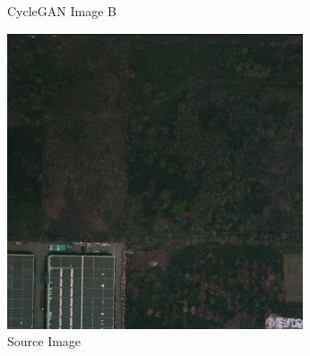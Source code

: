 \documentclass[10pt,twocolumn,letterpaper]{article}
\begin{document}
{\begin{figure}[t]
\begin{minipage}{0.48\textwidth}
\begin{subfigure}[b]{0.4\textwidth}
                \caption{CycleGAN Image B}
                \label{fig:image1508_fake}
            \end{subfigure}
            \caption{Comparison between original images and CycleGAN-generated images}
            \label{fig:CycleGAN}  
        \end{minipage}
        \hfill
        \begin{minipage}{0.48\textwidth} 
            \centering
            \captionsetup{font=small}
            \begin{subfigure}[b]{0.41\textwidth}
                \includegraphics[width=\textwidth]{images/dacs_source_im.png}
                \caption{Source Image}
            \end{subfigure}
            \hspace{2mm}
            \begin{subfigure}[b]{0.41\textwidth}

\end{subfigure}
\end{minipage}
\end{figure}}
\end{document}
